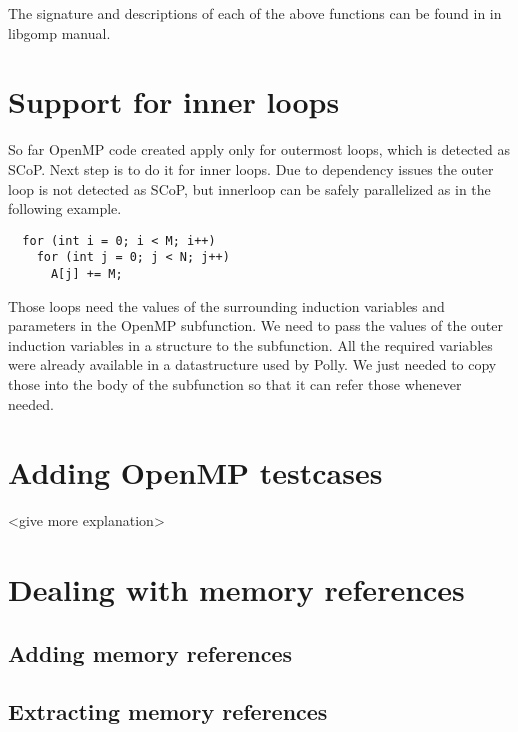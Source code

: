 The signature and descriptions of each of the above functions can be found in in libgomp manual\cite{libgomp}.

\section{Support for inner loops}

So far OpenMP code created apply only for outermost loops, which is detected as SCoP. Next step is to do it for
inner loops. Due to dependency issues the outer loop is not detected as SCoP, but innerloop can be safely
parallelized as in the following example.

\begin{lstlisting}
  for (int i = 0; i < M; i++)
    for (int j = 0; j < N; j++)
      A[j] += M;
\end{lstlisting}

Those loops need the values of the surrounding induction variables and parameters in the OpenMP subfunction. We need
to pass the values of the outer induction variables in a structure to the subfunction. All the required variables
were already available in a datastructure used by Polly. We just needed to copy those into the body of the subfunction
so that it can refer those whenever needed.

\section{Adding OpenMP testcases}

<give more explanation>

\section{Dealing with memory references}
\subsection{Adding memory references}
\subsection{Extracting memory references}
